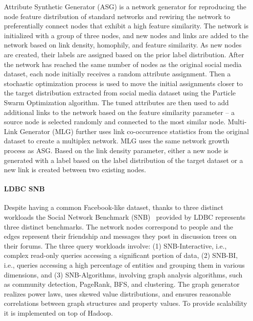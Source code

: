 Attribute Synthetic Generator (ASG) is a network generator for reproducing the
node feature distribution of standard networks and rewiring the network to
preferentially connect nodes that exhibit a high feature similarity. The network
is initialized with a group of three nodes, and new nodes and links are added to
the network based on link density, homophily, and feature similarity. As new
nodes are created, their labels are assigned based on the prior label
distribution. After the network has reached the same number of nodes as the
original social media dataset, each node initially receives a random attribute
assignment. Then a stochastic optimization process is used to move the initial
assignments closer to the target distribution extracted from social media
dataset using the Particle Swarm Optimization algorithm. The tuned attributes
are then used to add additional links to the network based on the feature
similarity parameter -- a source node is selected randomly and connected to the
most similar node. Multi-Link Generator (MLG) further  uses link co-occurrence statistics from the
original dataset to create a multiplex network. MLG uses the same network growth
process as ASG. Based on the link density parameter, either a new node is
generated with a label based on the label distribution of the target dataset or
a new link is created between two existing nodes.


\paragraph{LDBC SNB} Despite having a common Facebook-like dataset, thanks to three distinct workloads the Social Network Benchmark (SNB)~\cite{Erling:2015:LSN:2723372.2742786} provided by LDBC represents three distinct benchmarks. The network nodes correspond to people and the edges represent their friendship and messages they post in discussion trees on their forums. The three query workloads involve: (1) SNB-Interactive, i.e., complex read-only queries accessing a significant portion of data, (2) SNB-BI, i.e., queries accessing a high percentage of  entities and grouping them in various dimensions, and (3) SNB-Algorithms, involving graph analysis algorithms, such as community detection, PageRank, BFS, and clustering. The graph generator realizes power laws, uses skewed value distributions, and ensures reasonable correlations between graph structures and property values. To provide scalability it is implemented on top of Hadoop.


